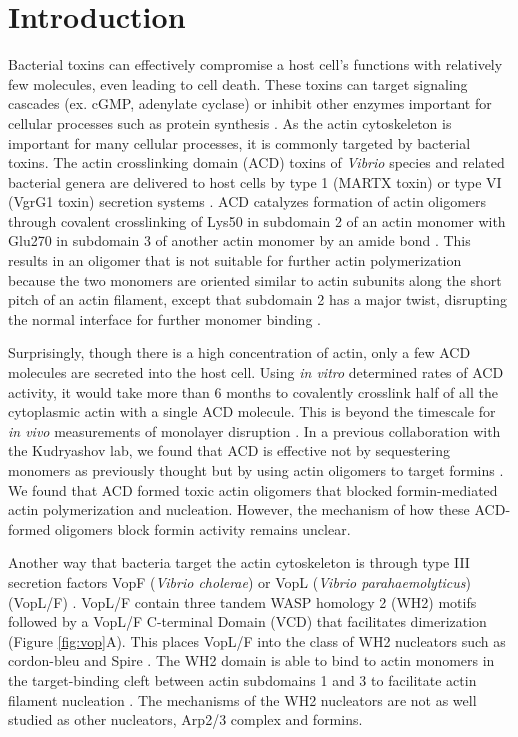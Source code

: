 \section{Introduction}\label{ch04-introduction}
Bacterial toxins can effectively compromise a host cell's functions with relatively few molecules, even leading to cell death. These toxins can target signaling cascades (ex. cGMP, adenylate cyclase) or inhibit other enzymes important for cellular processes such as protein synthesis \citep{henkel_toxins_2010}. As the actin cytoskeleton is important for many cellular processes, it is commonly targeted by bacterial toxins. The actin crosslinking domain (ACD) toxins of \textit{Vibrio} species and related bacterial genera are delivered to host cells by type 1 (MARTX toxin) \citep{sheahan_identification_2004} or type VI (VgrG1 toxin) secretion systems \citep{pukatzki_type_2007}. ACD catalyzes formation of actin oligomers through covalent crosslinking of Lys50 in subdomain 2 of an actin monomer with Glu270 in subdomain 3 of another actin monomer by an amide bond \citep{kudryashov_connecting_2008,kudryashova_glutamyl_2012}. This results in an oligomer that is not suitable for further actin polymerization because the two monomers are oriented similar to actin subunits along the short pitch of an actin filament, except that subdomain 2 has a major twist, disrupting the normal interface for further monomer binding \citep{kudryashov_connecting_2008}. 

Surprisingly, though there is a high concentration of actin, only a few ACD molecules are secreted into the host cell. Using \textit{in vitro} determined rates of ACD activity, it would take more than 6 months to covalently crosslink half of all the cytoplasmic actin with a single ACD molecule. This is beyond the timescale for \textit{in vivo} measurements of monolayer disruption \citep{kudryashova_glutamyl_2012, heisler_acd_2015}. In a previous collaboration with the Kudryashov lab, we found that ACD is effective not by sequestering monomers as previously thought but by using actin oligomers to target formins \citep{heisler_acd_2015}. We found that ACD formed toxic actin oligomers that blocked formin-mediated actin polymerization and nucleation. However, the mechanism of how these ACD-formed oligomers block formin activity remains unclear. 

Another way that bacteria target the actin cytoskeleton is through type III secretion factors VopF (\textit{Vibrio cholerae}) or VopL (\textit{Vibrio parahaemolyticus}) (VopL/F) \citep{tam_type_2007,liverman_arp2/3-independent_2007}. VopL/F contain three tandem WASP homology 2 (WH2) motifs followed by a VopL/F C-terminal Domain (VCD) that facilitates dimerization (Figure \ref{fig:vop}A). This places VopL/F into the class of WH2 nucleators such as cordon-bleu and Spire \citep{qualmann_new_2009}. The WH2 domain is able to bind to actin monomers in the target-binding cleft between actin subdomains 1 and 3 to facilitate actin filament nucleation \citep{namgoong_mechanism_2011}. The mechanisms of the WH2 nucleators are not as well studied as other nucleators, Arp2/3 complex and formins. 

